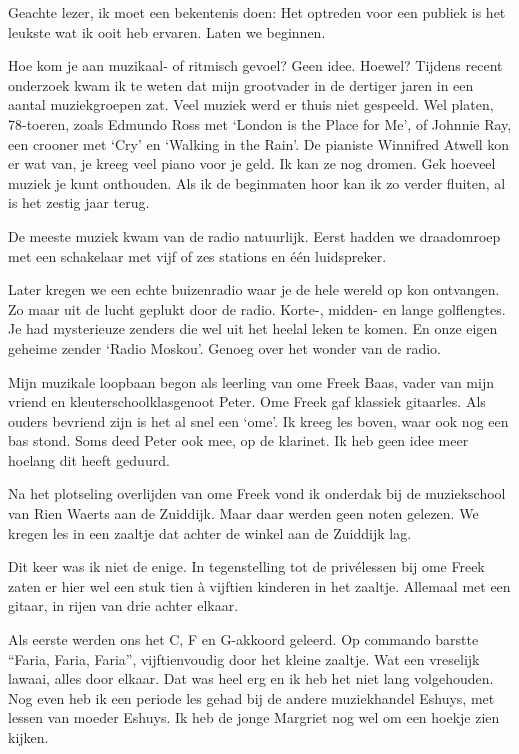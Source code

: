 \documentclass[12pt,twoside]{memoir}
\begin{document}
Geachte lezer, ik moet een bekentenis doen: Het optreden voor een publiek is het leukste wat ik ooit heb ervaren. Laten we beginnen.

Hoe kom je aan muzikaal- of ritmisch gevoel? Geen idee. Hoewel? Tijdens recent onderzoek kwam ik te weten dat mijn grootvader in de dertiger jaren in een aantal muziekgroepen zat. Veel muziek werd er thuis niet gespeeld. Wel platen, 78-toeren, zoals Edmundo Ross met `London is the Place for Me', of Johnnie Ray, een crooner met `Cry' en `Walking in the Rain'. De pianiste Winnifred Atwell kon er wat van, je kreeg veel piano voor je geld. Ik kan ze nog dromen. Gek hoeveel muziek je kunt onthouden. Als ik de beginmaten hoor kan ik zo verder fluiten, al is het zestig jaar terug. 

De meeste muziek kwam van de radio natuurlijk. Eerst hadden we draadomroep met een schakelaar met vijf of zes stations en één luidspreker. 

Later kregen we een echte buizenradio waar je de hele wereld op kon ontvangen. Zo maar uit de lucht geplukt door de radio. Korte-, midden- en lange golflengtes. Je had mysterieuze zenders die wel uit het heelal leken te komen. En onze eigen geheime zender `Radio Moskou’. Genoeg over het wonder van de radio.

Mijn muzikale loopbaan begon als leerling van ome Freek Baas, vader van mijn vriend en kleuterschoolklasgenoot Peter. Ome Freek gaf klassiek gitaarles. Als ouders bevriend zijn is het al snel een `ome'. Ik kreeg les boven, waar ook nog een bas stond. Soms deed Peter ook mee, op de klarinet. Ik heb geen idee meer hoelang dit heeft geduurd. 

Na het plotseling overlijden van ome Freek vond ik onderdak bij de muziekschool van Rien Waerts aan de Zuiddijk. Maar daar werden geen noten gelezen. We kregen les in een zaaltje dat achter de winkel aan de Zuiddijk lag. 

Dit keer was ik niet de enige. In tegenstelling tot de privélessen bij ome Freek zaten er hier wel een stuk tien à vijftien kinderen in het zaaltje. Allemaal met een gitaar, in rijen van drie achter elkaar. 

Als eerste werden ons het C, F en G-akkoord geleerd. Op commando barstte “Faria, Faria, Faria”, vijftienvoudig door het kleine zaaltje. Wat een vreselijk lawaai, alles door elkaar. Dat was heel erg en ik heb het niet lang volgehouden. Nog even heb ik een periode les gehad bij de andere muziekhandel Eshuys, met lessen van moeder Eshuys. Ik heb de jonge Margriet nog wel om een hoekje zien kijken. 
\end{document}
